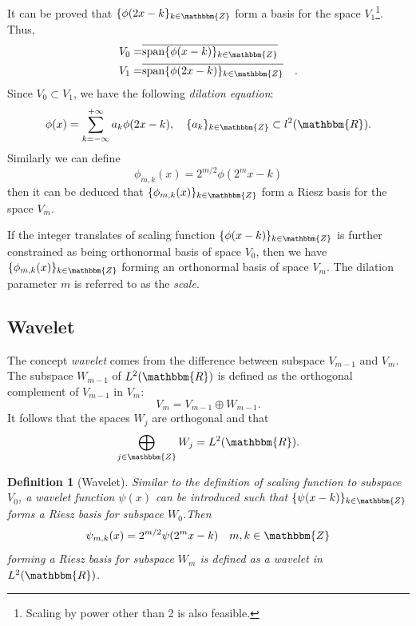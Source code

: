 \documentclass{book}
\newcommand{\nobracket}{}
\newcommand{\tmop}[1]{\ensuremath{\operatorname{#1}}}
\newcommand{\tmtextit}[1]{{\itshape{#1}}}
\newtheorem{definition}{Definition}
{\theorembodyfont{\rmfamily}\newtheorem{example}{Example}}
\begin{document}
It can be proved that $\{ \nobracket \phi (2 x - k \}_{k \in \mathbbm{Z}}$
form a basis for the space $V_1$\footnote{Scaling by power other than 2 is
also feasible.}. Thus,
\begin{eqnarray*}
  V_0 = & \overline{\tmop{span} \{ \phi (x - k) \}_{k \in \mathbbm{Z}}} & \\
  V_1 = & \overline{\tmop{span} \{ \phi (2 x - k) \}_{k \in \mathbbm{Z}}} & .
\end{eqnarray*}
Since $V_0 \subset V_1$, we have the following \tmtextit{dilation equation}:
\begin{equation}
  \phi (x) = \sum_{k = - \infty}^{+ \infty} a_k \phi (2 x - k), \quad \{ a_k
  \}_{k \in \mathbbm{Z}} \subset l^2 (\mathbbm{R}) . \label{dilation}
\end{equation}
Similarly we can define
\begin{equation}
  \phi_{m, k} (x) = 2^{m / 2} \phi (2^m x - k)
\end{equation}
then it can be deduced that $\{ \phi_{m, k} (x) \}_{k \in \mathbbm{Z}}$ form a
Riesz basis for the space $V_m$.

If the integer translates of scaling function $\{ \phi (x - k) \}_{k \in
\mathbbm{Z}}$ is further constrained as being orthonormal basis of space
$V_0$, then we have $\{ \phi_{m, k} (x) \}_{k \in \mathbbm{Z}}$ forming an
orthonormal basis of space $V_m$. The dilation parameter $m$ is referred to as
the \tmtextit{scale}.

\subsection{Wavelet}

The concept \tmtextit{wavelet} comes from the difference between subspace
$V_{m - 1}$ and $V_m$. The subspace $W_{m - 1}$ of $L^2 (\mathbbm{R})$ is
defined as the orthogonal complement of $V_{m - 1}$ in $V_m$:
\begin{equation}
  V_m = V_{m - 1} \oplus W_{m - 1} .
\end{equation}
It follows that the spaces $W_j$ are orthogonal and that
\begin{equation}
  \bigoplus_{j \in \mathbbm{Z}} W_j = L^2 (\mathbbm{R}) .
\end{equation}
\begin{definition}[Wavelet]
  Similar to the definition of scaling function to subspace $V_0$, a wavelet
  function $\psi (x)$ can be introduced such that $\{ \psi (x - k) \}_{k \in
  \mathbbm{Z}}$ forms a Riesz basis for subspace $W_0$.Then
  \begin{equation}
    \psi_{m, k} (x) = 2^{m / 2} \psi (2^m x - k) \quad m, k \in \mathbbm{Z}
  \end{equation}
  forming a Riesz basis for subspace $W_m$ is defined as a wavelet in $L^2
  (\mathbbm{R})$.
\end{definition}
\end{document}
